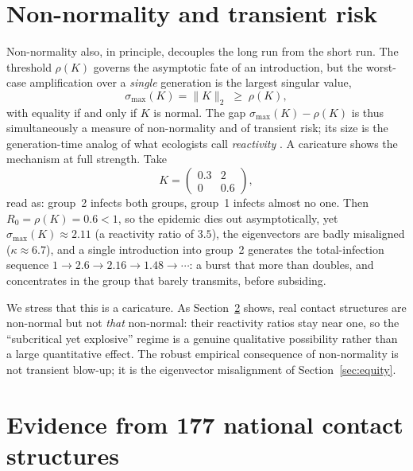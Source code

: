 \documentclass[12pt]{article}
\begin{document}
\section{Non-normality and transient risk}\label{sec:transient}

Non-normality also, in principle, decouples the long run from the short run. The threshold $\rho(K)$ governs the asymptotic fate of an introduction, but the worst-case amplification over a \emph{single} generation is the largest singular value,
\begin{equation}
\sigma_{\max}(K)=\lVert K\rVert_{2}\;\ge\;\rho(K),
\end{equation}
with equality if and only if $K$ is normal. The gap $\sigma_{\max}(K)-\rho(K)$ is thus simultaneously a measure of non-normality and of transient risk; its size is the generation-time analog of what ecologists call \emph{reactivity}
\cite{neubert1997}. A caricature shows the mechanism at full strength. Take
\begin{equation}
K=\begin{pmatrix} 0.3 & 2 \\ 0 & 0.6 \end{pmatrix},
\end{equation}
read as: group~2 infects both groups, group~1 infects almost no one. Then $R_0=\rho(K)=0.6<1$, so the epidemic dies out asymptotically, yet $\sigma_{\max}(K)\approx2.11$ (a reactivity ratio of $3.5$), the eigenvectors are badly misaligned ($\kappa\approx6.7$), and a single introduction into group~2
generates the total-infection sequence $1\to2.6\to2.16\to1.48\to\cdots$: a burst that more than doubles, and concentrates in the group that barely transmits,
before subsiding.

We stress that this is a caricature. As Section~\ref{sec:empirical} shows, real contact structures are non-normal but not \emph{that} non-normal: their reactivity ratios stay near one, so the ``subcritical yet explosive'' regime is a genuine qualitative
possibility rather than a large quantitative effect. The robust empirical consequence of non-normality is not transient blow-up; it is the eigenvector misalignment of Section~\ref{sec:equity}.

\section{Evidence from 177 national contact structures}\label{sec:empirical}
\end{document}
